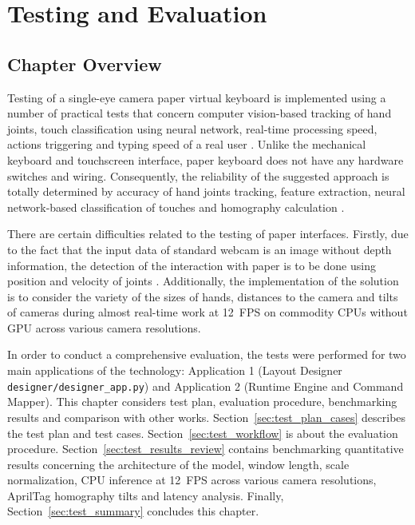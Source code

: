 \chapter{Testing and Evaluation}
\label{ch:testing_evaluation}

\section{Chapter Overview}
\label{sec:test_overview}
Testing of a single-eye camera paper virtual keyboard is implemented using a number of practical tests that concern computer vision-based tracking of hand joints, touch classification using neural network, real-time processing speed, actions triggering and typing speed of a real user \cite{ReviewVirtualKeyboard2020, Maman2023TypeNet}. Unlike the mechanical keyboard and touchscreen interface, paper keyboard does not have any hardware switches and wiring. Consequently, the reliability of the suggested approach is totally determined by accuracy of hand joints tracking, feature extraction, neural network-based classification of touches and homography calculation \cite{Zhang2020MediaPipe, Posner2012Single}.

There are certain difficulties related to the testing of paper interfaces. Firstly, due to the fact that the input data of standard webcam is an image without depth information, the detection of the interaction with paper is to be done using position and velocity of joints \cite{Thomas2013Camera}. Additionally, the implementation of the solution is to consider the variety of the sizes of hands, distances to the camera and tilts of cameras during almost real-time work at 12~FPS on commodity CPUs without GPU across various camera resolutions.

In order to conduct a comprehensive evaluation, the tests were performed for two main applications of the technology: Application 1 (Layout Designer \texttt{designer/designer\_app.py}) and Application 2 (Runtime Engine and Command Mapper). This chapter considers test plan, evaluation procedure, benchmarking results and comparison with other works. Section~\ref{sec:test_plan_cases} describes the test plan and test cases. Section~\ref{sec:test_workflow} is about the evaluation procedure. Section~\ref{sec:test_results_review} contains benchmarking quantitative results concerning the architecture of the model, window length, scale normalization, CPU inference at 12~FPS across various camera resolutions, AprilTag homography tilts and latency analysis. Finally, Section~\ref{sec:test_summary} concludes this chapter.

